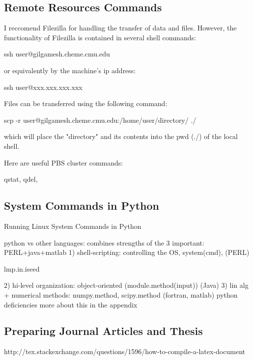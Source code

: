 \subsection{Remote Resources Commands}

I reccomend Filezilla for handling the transfer of data and files.  
However, the functionality of Filezilla is contained in several shell 
commands:

ssh user@gilgamesh.cheme.cmu.edu

or equivalently by the machine's ip address:

ssh user@xxx.xxx.xxx.xxx

Files can be transferred using the following command:

scp -r user@gilgamesh.cheme.cmu.edu:/home/user/directory/ ./

which will place the "directory" and its contents into the pwd (./) 
of the local shell. 

Here are useful PBS cluster commands:

qstat, qdel, 
 

\subsection{System Commands in Python}

Running Linux System Commands in Python
 
python vs other languages: combines strengths of the 3 important:
PERL+java+matlab
1) shell-scripting: controlling the OS, system(cmd), (PERL) 

lmp.in.iseed

2) hi-level organization: object-oriented (module.method(input)) (Java)
3) lin alg + numerical methods: numpy.method, scipy.method (fortran, matlab)
python deficiencies
more about this in the appendix

\subsection{Preparing Journal Articles and Thesis}

http://tex.stackexchange.com/questions/1596/how-to-compile-a-latex-document

